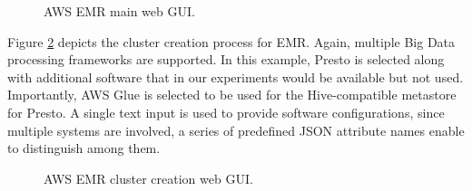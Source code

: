 \begin{figure}
   \begin{center}
   \end{center}
   \caption{AWS EMR main  web GUI.}
   \label{fig:emrMainGUI}
\end{figure}

Figure \ref{fig:emrClusterCreationGUI} depicts the cluster creation process for EMR. Again, multiple Big Data processing frameworks are supported. In this example, Presto is selected along with additional software that in our experiments would be available but not used. Importantly, AWS Glue is selected to be used for the Hive-compatible metastore for Presto. A single text input is used to provide software configurations, since multiple systems are involved, a series of predefined JSON attribute names enable to distinguish among them.

\begin{figure}
   \begin{center}
   \end{center}
   \caption{AWS EMR cluster creation web GUI.}
   \label{fig:emrClusterCreationGUI}
\end{figure}

